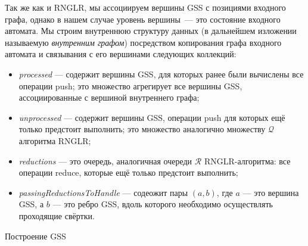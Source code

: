 Так же как и RNGLR, мы ассоциируем вершины GSS с позициями входного графа, однако в нашем случае уровень вершины~--- это состояние входного автомата. Мы строим внутреннюю структуру данных (в дальнейшем изложении называемую \emph{внутренним графом}) посредством копирования графа входного автомата и связывания с его вершинами следующих коллекций:
\begin{itemize}
  \item \emph{processed} --- содержит вершины GSS, для которых ранее были вычислены все операции push; это множество агрегирует все вершины GSS, ассоциированные с вершиной внутреннего графа;
  \item \emph{unprocessed} --- содержит вершины GSS, операции push для которых ещё только предстоит выполнить; это множество аналогично множеству $\mathcal{Q}$ алгоритма RNGLR;
  \item \emph{reductions} --- это очередь, аналогичная очереди $\mathcal{R}$ RNGLR-алгоритма: все операции reduce, которые ещё только предстоит выполнить;
  \item \emph{passingReductionsToHandle} --- содеожит пары $(a,b)$, где $a$ --- это вершина GSS, а $b$ --- это ребро GSS, вдоль которого необходимо осуществлять проходящие свёртки.
\end{itemize}

\begin{algorithm}[H]
\begin{algorithmic}[1]
\caption{Построение GSS}
\label{gss_construction}
   
  \Else
    \EndFor
  \EndIf
\EndFunction

    \EndIf
      \EndFor
    \EndIf
  \EndIf
\EndFunction
\end{algorithmic}
\end{algorithm}

